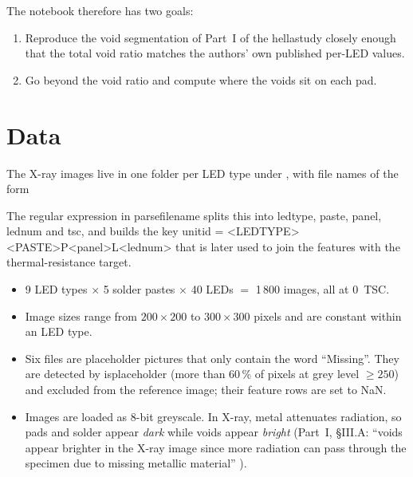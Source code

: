 \documentclass[11pt,a4paper]{article}
\newcommand{\code}[1]{{\ttfamily\def\_{\textunderscore\allowbreak}#1}}
\begin{document}
The notebook therefore has two goals:
\begin{enumerate}[nosep]
  \item Reproduce the void segmentation of Part~I of the hellastudy \cite{part1} closely enough
        that the total void ratio matches the authors' own published per-LED values.
  \item Go beyond the void ratio and compute where the voids sit on each pad.
\end{enumerate}

\section{Data}

The X-ray images live in one folder per LED type under , with file
names of the form
\begin{center}
\end{center}
The regular expression in \code{parse\_filename} splits this into \code{led\_type}, \code{paste}, \code{panel},
\code{led\_num} and \code{tsc}, and builds the key
\code{unit\_id = <LED\_TYPE>\_<PASTE>\_P<panel>\_L<led\_num>} that is later used to join the
features with the thermal-resistance target.

\begin{itemize}[nosep]
  \item 9 LED types $\times$ 5 solder pastes $\times$ 40 LEDs $=$ 1\,800 images, all at 0~TSC.
  \item Image sizes range from $200\times200$ to $300\times300$ pixels and are constant
        within an LED type.
  \item Six files are placeholder pictures that only contain the word ``Missing''. They are
        detected by \code{is\_placeholder} (more than 60\,\% of pixels at grey level $\geq 250$)
        and excluded from the reference image; their feature rows are set to \code{NaN}.
  \item Images are loaded as 8-bit greyscale. In X-ray, metal attenuates radiation, so pads
        and solder appear \emph{dark} while voids appear \emph{bright} (Part~I,
        \S III.A: ``voids appear brighter in the X-ray image since more radiation can pass
        through the specimen due to missing metallic material'' \cite{part1}).
\end{itemize}
\end{document}
